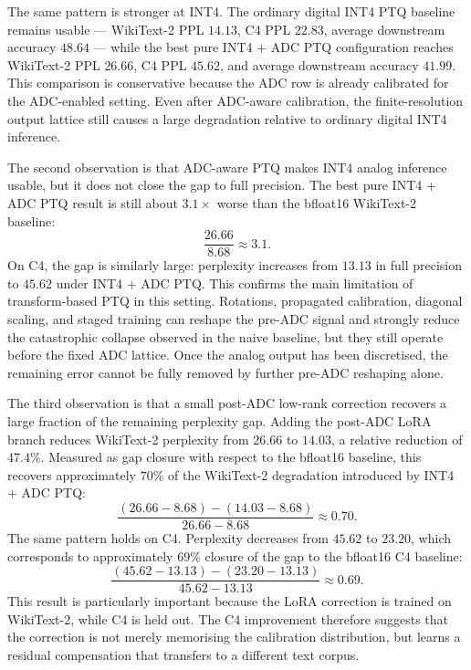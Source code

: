 \documentclass[a4paper,11pt,oneside]{article}
\theoremstyle{breakstyle}
\begin{document}
  The same pattern is stronger at INT4.  The ordinary digital INT4
  PTQ baseline remains usable --- WikiText-2 PPL $14.13$, C4 PPL
  $22.83$, average downstream accuracy $48.64$ --- while the best
  pure INT4 $+$ ADC PTQ configuration reaches WikiText-2 PPL $26.66$,
  C4 PPL $45.62$, and average downstream accuracy $41.99$.  This
  comparison is conservative because the ADC row is already
  calibrated for the ADC-enabled setting.  Even after ADC-aware calibration, the
  finite-resolution output lattice still causes a large degradation
  relative to ordinary digital INT4 inference.

  The second observation is that ADC-aware PTQ makes INT4 analog
  inference usable, but it does not close the gap to full precision.
  The best pure INT4 + ADC PTQ result is still about $3.1\times$ worse
  than the bfloat16 WikiText-2 baseline:
  \[
    \frac{26.66}{8.68} \approx 3.1 .
  \]
  On C4, the gap is similarly large: perplexity increases from $13.13$
  in full precision to $45.62$ under INT4 + ADC PTQ.  This confirms the
  main limitation of transform-based PTQ in this setting.  Rotations,
  propagated calibration, diagonal scaling, and staged training can
  reshape the pre-ADC signal and strongly reduce the catastrophic
  collapse observed in the naive baseline, but they still operate before
  the fixed ADC lattice.  Once the analog output has been discretised,
  the remaining error cannot be fully removed by further pre-ADC
  reshaping alone.

  The third observation is that a small post-ADC low-rank correction
  recovers a large fraction of the remaining perplexity gap.  Adding the
  post-ADC LoRA branch reduces WikiText-2 perplexity from $26.66$ to
  $14.03$, a relative reduction of $47.4\%$.  Measured as gap closure
  with respect to the bfloat16 baseline, this recovers approximately $70\%$
  of the WikiText-2 degradation introduced by INT4 + ADC PTQ:
  \[
    \frac{(26.66 - 8.68) - (14.03 - 8.68)}
        {26.66 - 8.68}
    \approx 0.70 .
  \]
  The same pattern holds on C4.  Perplexity decreases from $45.62$ to
  $23.20$, which corresponds to approximately $69\%$ closure of the
  gap to the bfloat16 C4 baseline:
  \[
    \frac{(45.62 - 13.13) - (23.20 - 13.13)}
        {45.62 - 13.13}
    \approx 0.69 .
  \]
  This result is particularly important because the LoRA correction is
  trained on WikiText-2, while C4 is held out.  The C4 improvement
  therefore suggests that the correction is not merely memorising the
  calibration distribution, but learns a residual compensation that
  transfers to a different text corpus.
\end{document}
